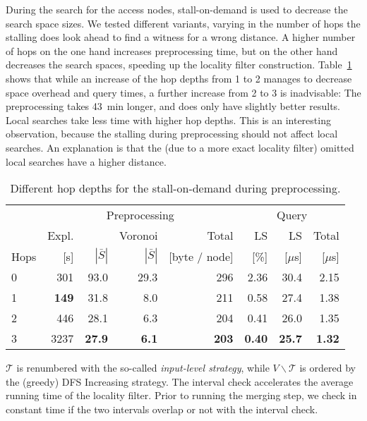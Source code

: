 \documentclass{llncs}
\begin{document}
During the search for the access nodes, stall-on-demand is used to decrease the search space sizes. 
We tested different variants, varying in the number of hops the stalling does look ahead to find a witness for a wrong distance. 
A higher number of hops on the one hand increases preprocessing time, but on the other hand decreases the search spaces, speeding up the locality filter construction.
Table~\ref{tab:StallOnDemand} shows that while an increase of the hop depths from 1 to 2 manages to decrease space overhead and query times, a further increase from 2 to 3 is inadvisable: 
The preprocessing takes \SI{43}{\minute} longer, and does only have slightly better results.
Local searches take less time with higher hop depths. 
This is an interesting observation, because the stalling during preprocessing should not affect local searches. 
An explanation is that the (due to a more exact locality filter) omitted local searches have a higher distance.

\begin{table}[b]
\caption{Different hop depths for the stall-on-demand during preprocessing.}
\label{tab:StallOnDemand}
\centering
\begin{tabular}{lrrrrrrr}
\toprule
 	& \multicolumn{4}{c}{Preprocessing} & \multicolumn{3}{c}{Query} \\
 		\cmidrule(lr){2-5} \cmidrule(lr){6-8}
	& Expl.	&  & Voronoi & Total & LS & LS & Total\\
Hops & [s] & $|\bar{S}|$ & $|\bar{S}|$ & [byte / node] & [\%] & [$\mu$s] & [$\mu$s]\\
\midrule 
0	& 301			& 93.0 			& 29.3 			& 296 		& 2.36 & 30.4 & 2.15 \\
1 	& \textbf{149} 	& 31.8 			& 8.0 			& 211 		& 0.58 & 27.4 & 1.38 \\ 
2	& 446 			& 28.1 			& 6.3 			& 204 		& 0.41 & 26.0 & 1.35 \\ 
3 	& 3237 			& \textbf{27.9} & \textbf{6.1} & \textbf{203} & \textbf{0.40} & \textbf{25.7} & \textbf{1.32} \\ 
\bottomrule 
\end{tabular}
\end{table}

$\mathcal{T}$ is renumbered with the so-called \textit{input-level strategy}, while $V\backslash\mathcal{T}$ is ordered by the (greedy) DFS Increasing strategy.
The interval check accelerates the average running time of the locality filter. 
Prior to running the merging step, we check in constant time if the two intervals overlap or not with the interval check. 
\end{document}
